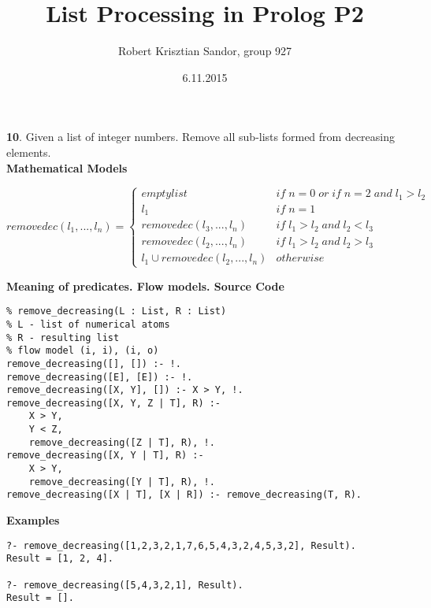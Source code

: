 \documentclass[11pt]{article}
\title{\textbf{List Processing in Prolog P2}}
\author{Robert Krisztian Sandor, group 927}
\date{6.11.2015}
\begin{document}
\maketitle

\textbf{10}. Given a list of integer numbers. Remove all sub-lists formed from decreasing elements. \\

\textbf{Mathematical Models}

\[
removedec(l_1, ..., l_n) = 
\left \{
	\begin{array}{ll}
		empty list & if \; n = 0 \; or \; if \; n = 2 \; and \; l_1 > l_2 \\
		l_1 & if \; n = 1 \\
		removedec(l_3, ..., l_n) & if \; l_1 > l_2 \; and \; l_2 < l_3 \\
		removedec(l_2, ..., l_n) & if \; l_1 > l_2 \; and \; l_2 > l_3 \\
		l_1 \cup removedec(l_2, ..., l_n) & otherwise
	\end{array}
\right.
\]

\textbf{Meaning of predicates. Flow models. Source Code}

\begin{verbatim}
% remove_decreasing(L : List, R : List)
% L - list of numerical atoms
% R - resulting list
% flow model (i, i), (i, o)
remove_decreasing([], []) :- !.
remove_decreasing([E], [E]) :- !.
remove_decreasing([X, Y], []) :- X > Y, !.
remove_decreasing([X, Y, Z | T], R) :-
    X > Y,
    Y < Z,
    remove_decreasing([Z | T], R), !.
remove_decreasing([X, Y | T], R) :-
    X > Y,
    remove_decreasing([Y | T], R), !.
remove_decreasing([X | T], [X | R]) :- remove_decreasing(T, R).
\end{verbatim}

\newpage

\textbf{Examples}
\begin{verbatim}
?- remove_decreasing([1,2,3,2,1,7,6,5,4,3,2,4,5,3,2], Result).
Result = [1, 2, 4].

?- remove_decreasing([5,4,3,2,1], Result).
Result = [].
\end{verbatim}
\end{document}
